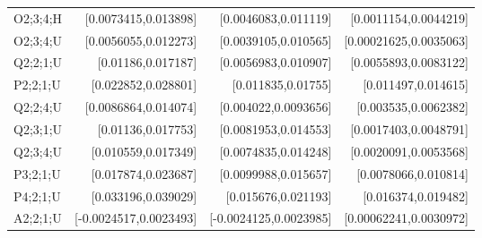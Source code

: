 {\begin{longtable}{@{}lrrr@{}}
O2;3;4;H & [0.0073415,0.013898] & [0.0046083,0.011119] & [0.0011154,0.0044219] \\
O2;3;4;U & [0.0056055,0.012273] & [0.0039105,0.010565] & [0.00021625,0.0035063] \\
Q2;2;1;U & [0.01186,0.017187] & [0.0056983,0.010907] & [0.0055893,0.0083122] \\
P2;2;1;U & [0.022852,0.028801] & [0.011835,0.01755] & [0.011497,0.014615] \\
Q2;2;4;U & [0.0086864,0.014074] & [0.004022,0.0093656] & [0.003535,0.0062382] \\
Q2;3;1;U & [0.01136,0.017753] & [0.0081953,0.014553] & [0.0017403,0.0048791] \\
Q2;3;4;U & [0.010559,0.017349] & [0.0074835,0.014248] & [0.0020091,0.0053568] \\
P3;2;1;U & [0.017874,0.023687] & [0.0099988,0.015657] & [0.0078066,0.010814] \\
P4;2;1;U & [0.033196,0.039029] & [0.015676,0.021193] & [0.016374,0.019482] \\
A2;2;1;U & [-0.0024517,0.0023493] & [-0.0024125,0.0023985] & [0.00062241,0.0030972] \\
\end{longtable}
}
